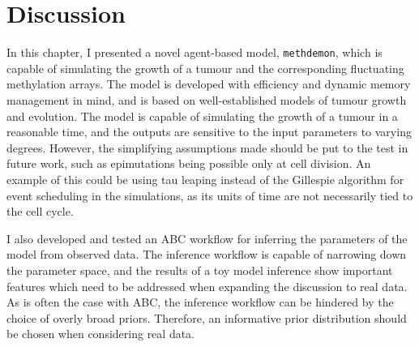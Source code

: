 \section{Discussion}
In this chapter, I presented a novel agent-based model, \texttt{methdemon},
which is capable of simulating the growth of a tumour and the corresponding
fluctuating methylation arrays. The model is developed with efficiency and
dynamic memory management in mind, and is based on well-established models of
tumour growth and evolution. The model is capable of simulating the growth of a
tumour in a reasonable time, and the outputs are sensitive to the input
parameters to varying degrees. However, the simplifying assumptions made should
be put to the test in future work, such as epimutations being possible only at
cell division. An example of this could be using tau leaping instead of the
Gillespie algorithm for event scheduling in the simulations, as its units of
time are not necessarily tied to the cell cycle. \par
I also developed and tested an ABC workflow for inferring the parameters of the
model from observed data. The inference workflow is capable of narrowing down
the parameter space, and the results of a toy model inference show important
features which need to be addressed when expanding the discussion to real data.
As is often the case with ABC, the inference workflow can be hindered by the
choice of overly broad priors. Therefore, an informative prior distribution
should be chosen when considering real data.
